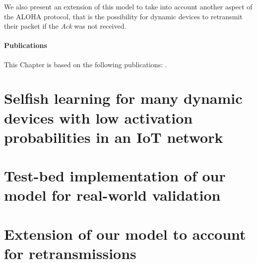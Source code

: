 We also present an extension of this model to take into account another aspect of the ALOHA protocol, that is the possibility for dynamic devices to retransmit their packet if the \emph{Ack} was not received.


\paragraph{Publications}
This Chapter is based on the following publications: \cite{Bonnefoi17,Besson2018ICT,Besson2019WCNC,Bonnefoi2019WCNC}.


\section{Selfish learning for many dynamic devices with low activation probabilities in an IoT network}
\label{sec:4:firstModel}





\section{Test-bed implementation of our model for real-world validation}
\label{sec:4:gnuradio}






\section{Extension of our model to account for retransmissions}
\label{sec:4:retransmissions}

